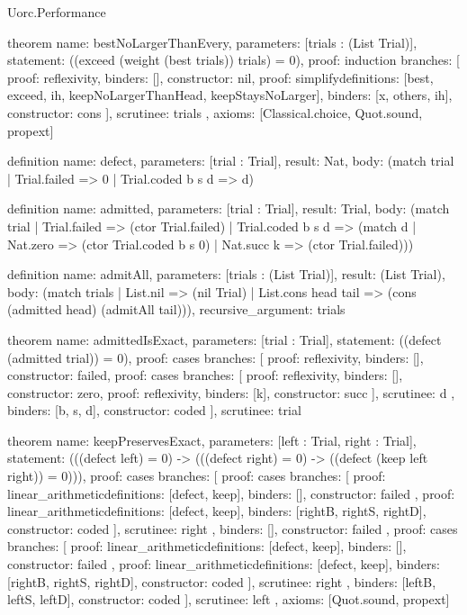 \begin{lexlean}{Uorc.Performance}
\begin{semanticmodule}
theorem{
  name: bestNoLargerThanEvery,
  parameters: [trials : (List Trial)],
  statement: ((exceed (weight (best trials)) trials) = 0),
  proof: induction{
    branches: [
      {proof: reflexivity{}, binders: [], constructor: nil},
      {
        proof: simplify{definitions: [best, exceed, ih, keepNoLargerThanHead, keepStaysNoLarger]},
        binders: [x, others, ih],
        constructor: cons
      }
    ],
    scrutinee: trials
  },
  axioms: [Classical.choice, Quot.sound, propext]
}

definition{
  name: defect,
  parameters: [trial : Trial],
  result: Nat,
  body: (match trial | Trial.failed => 0 | Trial.coded b s d => d)
}

definition{
  name: admitted,
  parameters: [trial : Trial],
  result: Trial,
  body: (match trial
    | Trial.failed => (ctor Trial.failed)
    | Trial.coded b s d => (match d
      | Nat.zero => (ctor Trial.coded b s 0)
      | Nat.succ k => (ctor Trial.failed)))
}

definition{
  name: admitAll,
  parameters: [trials : (List Trial)],
  result: (List Trial),
  body: (match trials
    | List.nil => (nil Trial)
    | List.cons head tail => (cons (admitted head) (admitAll tail))),
  recursive_argument: trials
}

theorem{
  name: admittedIsExact,
  parameters: [trial : Trial],
  statement: ((defect (admitted trial)) = 0),
  proof: cases{
    branches: [
      {proof: reflexivity{}, binders: [], constructor: failed},
      {
        proof: cases{
          branches: [
            {proof: reflexivity{}, binders: [], constructor: zero},
            {proof: reflexivity{}, binders: [k], constructor: succ}
          ],
          scrutinee: d
        },
        binders: [b, s, d],
        constructor: coded
      }
    ],
    scrutinee: trial
  }
}

theorem{
  name: keepPreservesExact,
  parameters: [left : Trial, right : Trial],
  statement: (((defect left) = 0) -> (((defect right) = 0) -> ((defect (keep left right)) = 0))),
  proof: cases{
    branches: [
      {
        proof: cases{
          branches: [
            {
              proof: linear_arithmetic{definitions: [defect, keep]},
              binders: [],
              constructor: failed
            },
            {
              proof: linear_arithmetic{definitions: [defect, keep]},
              binders: [rightB, rightS, rightD],
              constructor: coded
            }
          ],
          scrutinee: right
        },
        binders: [],
        constructor: failed
      },
      {
        proof: cases{
          branches: [
            {
              proof: linear_arithmetic{definitions: [defect, keep]},
              binders: [],
              constructor: failed
            },
            {
              proof: linear_arithmetic{definitions: [defect, keep]},
              binders: [rightB, rightS, rightD],
              constructor: coded
            }
          ],
          scrutinee: right
        },
        binders: [leftB, leftS, leftD],
        constructor: coded
      }
    ],
    scrutinee: left
  },
  axioms: [Quot.sound, propext]
}


\end{semanticmodule}
\end{lexlean}
